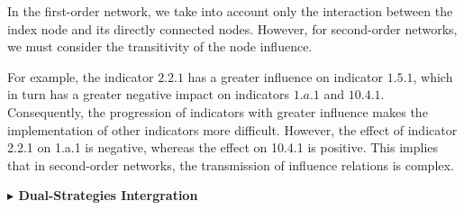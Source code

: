 \documentclass[12pt]{article}  %
\begin{document}
In the first-order network, we take into account only the interaction between the index node and its directly connected nodes. However, for second-order networks, we must consider the transitivity of the node influence. 


For example, the indicator $2.2.1$ has a greater influence on  indicator $1.5.1$, which in turn has a greater negative impact on  indicators $1.a.1$ and $10.4.1$. Consequently, the progression of indicators with greater influence makes the implementation of other indicators more difficult. 
However, the effect of indicator 2.2.1 on 1.a.1 is negative, whereas the effect on 10.4.1 is positive. This implies that in second-order networks, the transmission of influence relations is complex.

\vspace{0.7mm}\begin{itshape}
\textbf{$\blacktriangleright$ Dual-Strategies Intergration}
\end{itshape}
\end{document}
